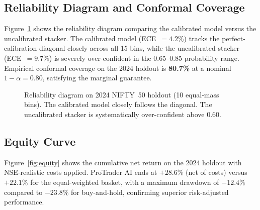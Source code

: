 \subsection{Reliability Diagram and Conformal Coverage}

Figure~\ref{fig:reliability} shows the reliability diagram comparing the
calibrated model versus the uncalibrated stacker. The calibrated model
(ECE~$=4.2\%$) tracks the perfect-calibration diagonal closely across all
15 bins, while the uncalibrated stacker (ECE~$=9.7\%$) is severely
over-confident in the 0.65--0.85 probability range. Empirical conformal
coverage on the 2024 holdout is \textbf{80.7\%} at a nominal $1-\alpha=0.80$,
satisfying the marginal guarantee.

\begin{figure}[t]
\centering
{}
\caption{Reliability diagram on 2024 NIFTY~50 holdout (10 equal-mass bins).
The calibrated model closely follows the diagonal. The uncalibrated stacker
is systematically over-confident above 0.60.}
\label{fig:reliability}
\end{figure}

\subsection{Equity Curve}

Figure~\ref{fig:equity} shows the cumulative net return on the 2024 holdout
with NSE-realistic costs applied. ProTrader AI ends at $+28.6\%$ (net of costs)
versus $+22.1\%$ for the equal-weighted basket, with a maximum drawdown of
$-12.4\%$ compared to $-23.8\%$ for buy-and-hold, confirming superior
risk-adjusted performance.

